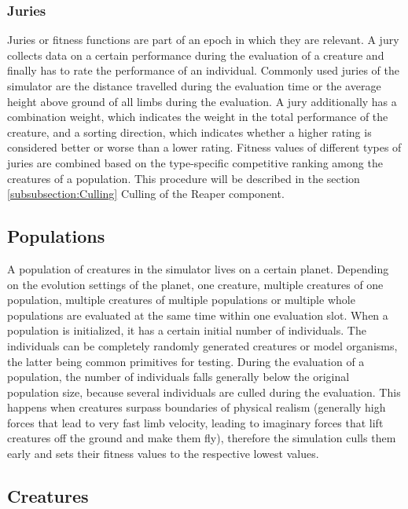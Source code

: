 \documentclass[main]{subfiles}
\begin{document}
\subsubsection{Juries}

Juries or fitness functions are part of an epoch in which they are relevant. A jury collects data on a certain performance during the evaluation of a creature and finally has to rate the performance of an individual. Commonly used juries of the simulator are the distance travelled during the evaluation time or the average height above ground of all limbs during the evaluation. A jury additionally has a combination weight, which indicates the weight in the total performance of the creature, and a sorting direction, which indicates whether a higher rating is considered better or worse than a lower rating. Fitness values of different types of juries are combined based on the type-specific competitive ranking among the creatures of a population. This procedure will be described in the section \ref{subsubsection:Culling} Culling of the Reaper component.

\subsection{Populations}
\label{subsec:populations}

A population of creatures in the simulator lives on a certain planet. Depending on the evolution settings of the planet, one creature, multiple creatures of one population, multiple creatures of multiple populations or multiple whole populations are evaluated at the same time within one evaluation slot. When a population is initialized, it has a certain initial number of individuals. The individuals can be completely randomly generated creatures or model organisms, the latter being common primitives for testing. During the evaluation of a population, the number of individuals falls generally below the original population size, because several individuals are culled during the evaluation. This happens when creatures surpass boundaries of physical realism (generally high forces that lead to very fast limb velocity, leading to imaginary forces that lift creatures off the ground and make them fly), therefore the simulation culls them early and sets their fitness values to the respective lowest values. 

\subsection{Creatures}
\end{document}
